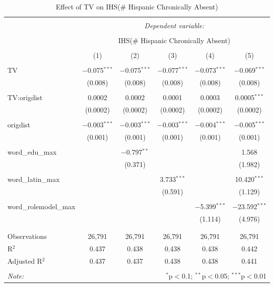 
\begin{table}[!htbp] \centering 
  \caption{Effect of TV on IHS(\# Hispanic Chronically Absent)} 
  \label{} 
\begin{tabular}{@{\extracolsep{-2pt}}lccccc} 
\\[-1.8ex]\hline 
\hline \\[-1.8ex] 
 & \multicolumn{5}{c}{\textit{Dependent variable:}} \\ 
\cline{2-6} 
\\[-1.8ex] & \multicolumn{5}{c}{IHS(\# Hispanic Chronically Absent)} \\ 
\\[-1.8ex] & (1) & (2) & (3) & (4) & (5)\\ 
\hline \\[-1.8ex] 
 TV & $-$0.075$^{***}$ & $-$0.075$^{***}$ & $-$0.077$^{***}$ & $-$0.073$^{***}$ & $-$0.069$^{***}$ \\ 
  & (0.008) & (0.008) & (0.008) & (0.008) & (0.008) \\ 
  & & & & & \\ 
 TV:origdist & 0.0002 & 0.0002 & 0.0001 & 0.0003 & 0.0005$^{***}$ \\ 
  & (0.0002) & (0.0002) & (0.0002) & (0.0002) & (0.0002) \\ 
  & & & & & \\ 
 origdist & $-$0.003$^{***}$ & $-$0.003$^{***}$ & $-$0.003$^{***}$ & $-$0.004$^{***}$ & $-$0.005$^{***}$ \\ 
  & (0.001) & (0.001) & (0.001) & (0.001) & (0.001) \\ 
  & & & & & \\ 
 word\_edu\_max &  & $-$0.797$^{**}$ &  &  & 1.568 \\ 
  &  & (0.371) &  &  & (1.982) \\ 
  & & & & & \\ 
 word\_latin\_max &  &  & 3.733$^{***}$ &  & 10.420$^{***}$ \\ 
  &  &  & (0.591) &  & (1.129) \\ 
  & & & & & \\ 
 word\_rolemodel\_max &  &  &  & $-$5.399$^{***}$ & $-$23.592$^{***}$ \\ 
  &  &  &  & (1.114) & (4.976) \\ 
  & & & & & \\ 
\hline \\[-1.8ex] 
Observations & 26,791 & 26,791 & 26,791 & 26,791 & 26,791 \\ 
R$^{2}$ & 0.437 & 0.438 & 0.438 & 0.438 & 0.442 \\ 
Adjusted R$^{2}$ & 0.437 & 0.437 & 0.438 & 0.438 & 0.441 \\ 
\hline 
\hline \\[-1.8ex] 
\textit{Note:}  & \multicolumn{5}{r}{$^{*}$p$<$0.1; $^{**}$p$<$0.05; $^{***}$p$<$0.01} \\ 
\end{tabular} 
\end{table} 
